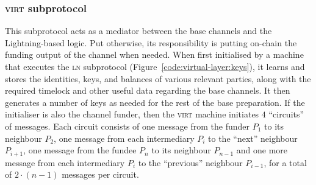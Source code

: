   \subsubsection{\textsc{virt} subprotocol}
  This subprotocol acts as a mediator between the base channels and the
  Lightning-based logic. Put otherwise, its responsibility is putting on-chain
  the funding output of the channel when needed. When first initialised by a
  machine that executes the \textsc{ln} subprotocol
  (Figure~\ref{code:virtual-layer:keys}), it learns and stores the identities,
  keys, and balances of various relevant parties, along with the required
  timelock and other useful data regarding the base channels. It then generates
  a number of keys as needed for the rest of the base preparation. If the
  initialiser is also the channel funder, then the \textsc{virt} machine
  initiates $4$ ``circuits'' of messages. Each circuit consists of one message
  from the funder $P_1$ to its neighbour $P_2$, one message from each
  intermediary $P_i$ to the ``next'' neighbour $P_{i+1}$, one message from the
  fundee $P_n$ to its neighbour $P_{n-1}$ and one more message from each
  intermediary $P_i$ to the ``previous'' neighbour $P_{i-1}$, for a total of
  $2\cdot(n-1)$ messages per circuit.


